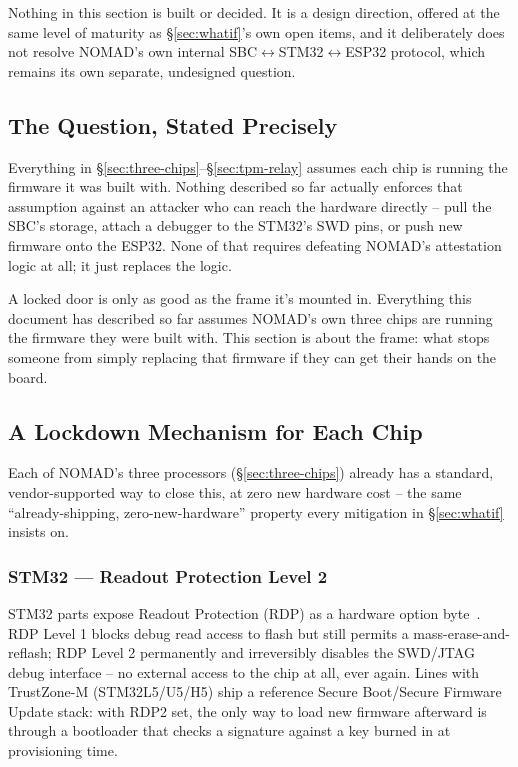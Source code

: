 \documentclass[11pt,a4paper]{article}
\begin{document}
\begin{notebox}[Status]
Nothing in this section is built or decided. It is a design direction,
offered at the same level of maturity as \S\ref{sec:whatif}'s own open
items, and it deliberately does not resolve NOMAD's own internal
SBC$\leftrightarrow$STM32$\leftrightarrow$ESP32 protocol, which remains
its own separate, undesigned question.
\end{notebox}

\subsection{The Question, Stated Precisely}

Everything in \S\ref{sec:three-chips}--\S\ref{sec:tpm-relay} assumes
each chip is running the firmware it was built with. Nothing described
so far actually enforces that assumption against an attacker who can
reach the hardware directly -- pull the SBC's storage, attach a
debugger to the STM32's SWD pins, or push new firmware onto the ESP32.
None of that requires defeating NOMAD's attestation logic at all; it
just replaces the logic.

\begin{plainbox}
A locked door is only as good as the frame it's mounted in. Everything
this document has described so far assumes NOMAD's own three chips are
running the firmware they were built with. This section is about the
frame: what stops someone from simply replacing that firmware if they
can get their hands on the board.
\end{plainbox}

\subsection{A Lockdown Mechanism for Each Chip}
\label{sec:reprogram-mechanisms}

Each of NOMAD's three processors (\S\ref{sec:three-chips}) already has
a standard, vendor-supported way to close this, at zero new hardware
cost -- the same ``already-shipping, zero-new-hardware'' property every
mitigation in \S\ref{sec:whatif} insists on.

\subsubsection{STM32 --- Readout Protection Level 2}

STM32 parts expose Readout Protection (RDP) as a hardware option
byte~\cite{stm32rdp}. RDP Level 1 blocks debug read access to flash but
still permits a mass-erase-and-reflash; RDP Level 2 permanently and
irreversibly disables the SWD/JTAG debug interface -- no external
access to the chip at all, ever again. Lines with TrustZone-M
(STM32L5/U5/H5) ship a reference Secure Boot/Secure Firmware Update
stack: with RDP2 set, the only way to load new firmware afterward is
through a bootloader that checks a signature against a key burned in
at provisioning time.
\end{document}
